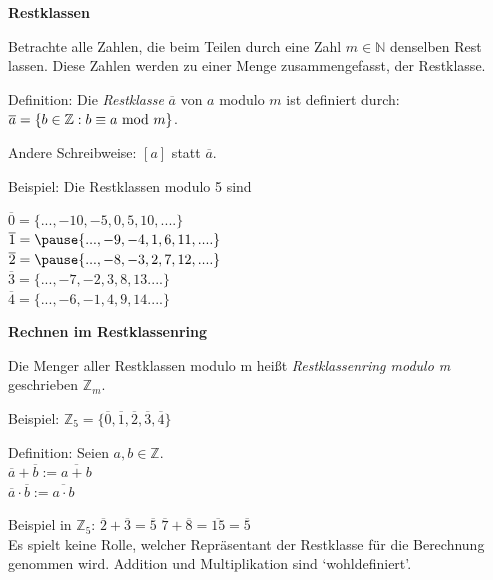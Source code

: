 \begin{frame}[fragile]
\textbf{Restklassen} 

Betrachte alle Zahlen, die beim Teilen durch eine Zahl $m \in \mathbb{N}$ denselben Rest lassen. Diese Zahlen werden zu einer
Menge zusammengefasst, der Restklasse. \pause

Definition: Die \textit{Restklasse} $\overline{a}$ von $a$ modulo $m$ ist definiert durch: \\
$\overline{a} = \{b \in \mathbb{Z}: b\equiv a\text{ mod }m\}$. \pause

Andere Schreibweise: $[a]$ statt $\overline{a}$. \pause

Beispiel: Die Restklassen modulo 5 sind

$\overline{0} = \{ ..., -10, -5, 0, 5, 10, ....\}$ \\
$\overline{1} = \pause \{ ..., -9, -4, 1, 6, 11, ....\}$ \\
$\overline{2} = \pause  \{ ..., -8, -3, 2, 7, 12, ....\}$ \\
$\overline{3} = \{ ..., -7, -2, 3, 8, 13 ....\}$ \\
$\overline{4} = \{ ..., -6, -1, 4, 9, 14 ....\}$ \\

\end{frame}
 
\begin{frame}[fragile]

\textbf{Rechnen im Restklassenring}

Die Menger aller Restklassen modulo m heißt \textit{Restklassenring modulo m} geschrieben  $\mathbb{Z}_m$. \pause

Beispiel:  $\mathbb{Z}_5 =\{ \overline{0}, \overline{1}, \overline{2},\overline{3}, \overline{4} \} $ \pause

Definition: Seien $a,b \in \mathbb{Z}$. \\
$\overline{a} + \overline{b} := \overline{a+b}$ \\
$\overline{a} \cdot \overline{b} := \overline{a \cdot b}$  \pause

Beispiel in  $\mathbb{Z}_5$: $\overline{2} + \overline{3} = \overline{5}$ 
\quad $\overline{7} + \overline{8} = \overline{15} = \overline{5}$\\ \pause
Es spielt keine Rolle, welcher Repräsentant der Restklasse für die Berechnung genommen wird. Addition und Multiplikation sind  `wohldefiniert'.

\end{frame}


